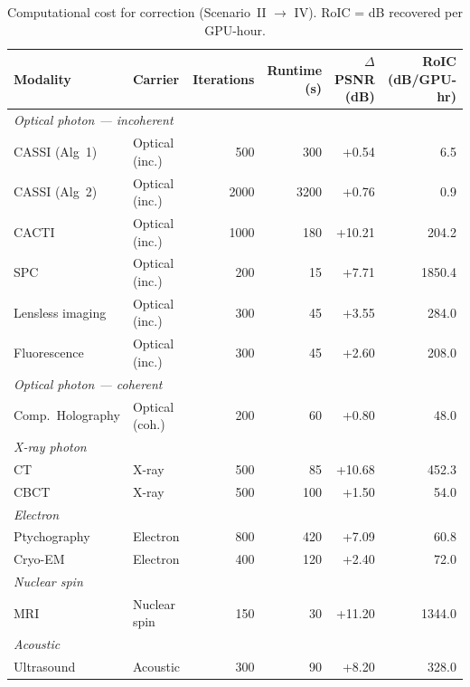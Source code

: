 \documentclass[11pt]{article}
\theoremstyle{definition}
\begin{document}
\begin{table}[htbp]
\centering
\caption{Computational cost for correction (Scenario~II $\to$ IV).
RoIC = dB recovered per GPU-hour.}
\label{tab:cost}
\begin{tabular}{l l r r r r}
\toprule
\textbf{Modality} & \textbf{Carrier} & \textbf{Iterations} & \textbf{Runtime (s)} &
  \textbf{$\Delta$PSNR (dB)} & \textbf{RoIC (dB/GPU-hr)} \\
\midrule
\multicolumn{6}{l}{\textit{Optical photon — incoherent}} \\
CASSI (Alg~1)    & Optical (inc.)  &   500 &    300 &  +0.54 &    6.5 \\
CASSI (Alg~2)    & Optical (inc.)  &  2000 &   3200 &  +0.76 &    0.9 \\
CACTI            & Optical (inc.)  &  1000 &    180 & +10.21 &  204.2 \\
SPC              & Optical (inc.)  &   200 &     15 &  +7.71 & 1850.4 \\
Lensless imaging & Optical (inc.)  &   300 &     45 &  +3.55 &  284.0 \\
Fluorescence     & Optical (inc.)  &   300 &     45 &  +2.60 &  208.0 \\
\multicolumn{6}{l}{\textit{Optical photon — coherent}} \\
Comp.\ Holography & Optical (coh.) &   200 &     60 &  +0.80 &   48.0 \\
\multicolumn{6}{l}{\textit{X-ray photon}} \\
CT               & X-ray           &   500 &     85 & +10.68 &  452.3 \\
CBCT             & X-ray           &   500 &    100 &  +1.50 &   54.0 \\
\multicolumn{6}{l}{\textit{Electron}} \\
Ptychography     & Electron        &   800 &    420 &  +7.09 &   60.8 \\
Cryo-EM          & Electron        &   400 &    120 &  +2.40 &   72.0 \\
\multicolumn{6}{l}{\textit{Nuclear spin}} \\
MRI              & Nuclear spin    &   150 &     30 & +11.20 & 1344.0 \\
\multicolumn{6}{l}{\textit{Acoustic}} \\
Ultrasound       & Acoustic        &   300 &     90 &  +8.20 &  328.0 \\
\bottomrule
\end{tabular}
\end{table}
\end{document}
